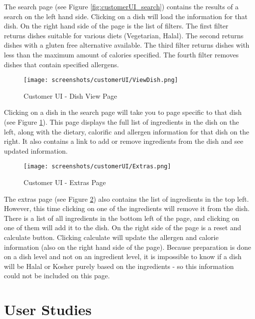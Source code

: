 The search page (see Figure \ref{fig:customerUI_search}) contains the results of a search on the left hand side. Clicking on a dish will load the information for that dish. On the right hand side of the page is the list of filters. The first filter returns dishes suitable for various diets (Vegetarian, Halal). The second returns dishes with a gluten free alternative available. The third filter returns dishes with less than the maximum amount of calories specified. The fourth filter removes dishes that contain specified allergens.

\begin{figure}[h]
    \centering
    \captionsetup{justification=centering}
    \texttt{[image: screenshots/customerUI/ViewDish.png]}
    \caption{Customer UI - Dish View Page}
    \label{fig:customerUI_view_dish}
\end{figure}

Clicking on a dish in the search page will take you to page specific to that dish (see Figure \ref{fig:customerUI_view_dish}). This page displays the full list of ingredients in the dish on the left, along with the dietary, calorific and allergen information for that dish on the right. It also contains a link to add or remove ingredients from the dish and see updated information.

\begin{figure}[h]
    \centering
    \captionsetup{justification=centering}
    \texttt{[image: screenshots/customerUI/Extras.png]}
    \caption{Customer UI - Extras Page}
    \label{fig:customerUI_extras}
\end{figure}

The extras page (see Figure \ref{fig:customerUI_extras}) also contains the list of ingredients in the top left. However, this time clicking on one of the ingredients will remove it from the dish. There is a list of all ingredients in the bottom left of the page, and clicking on one of them will add it to the dish. On the right side of the page is a reset and calculate button. Clicking calculate will update the allergen and calorie information (also on the right hand side of the page). Because preparation is done on a dish level and not on an ingredient level, it is impossible to know if a dish will be Halal or Kosher purely based on the ingredients - so this information could not be included on this page.

\section{User Studies}

